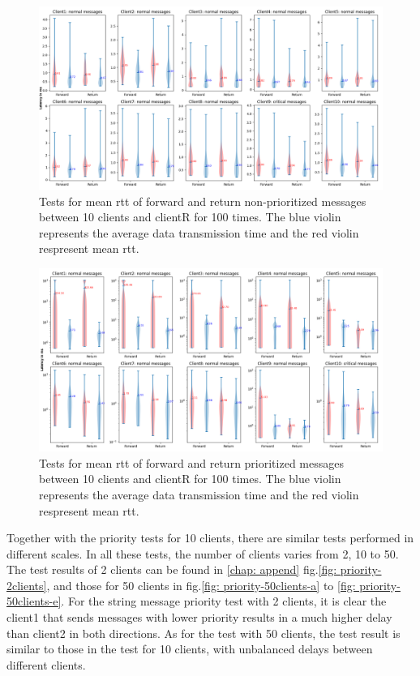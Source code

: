 \begin{figure}
    \centering
    \includegraphics[width=\textheight]{figures/tests/priority_tests/log_violin_10clients_non_priority.png}\hfill 
    \caption{Tests for mean \gls{rtt} of forward and return non-prioritized messages between 10 clients 
    and clientR for 100 times. The blue violin represents the average data transmission time and the red violin 
    respresent mean \gls{rtt}.} \label{fig: priority-10clients-a}
\end{figure}
\begin{figure}
    \includegraphics[width=\textheight]{figures/tests/priority_tests/log_violin_10clients_priority.png}\hfill 
    \caption{Tests for mean \gls{rtt} of forward and return prioritized messages between 10 clients 
    and clientR for 100 times. The blue violin represents the average data transmission time and the red violin 
    respresent mean \gls{rtt}.} \label{fig: priority-10clients-b}
\end{figure}



Together with the priority tests for 10 clients, there are similar tests performed in different scales. 
In all these tests, the number of clients varies from 2, 10 to 50. The test results 
of 2 clients can be found in \ref{chap: append} fig.\ref{fig: priority-2clients}, 
and those for 50 clients in fig.\ref{fig: priority-50clients-a} to 
\ref{fig: priority-50clients-e}. For the string message priority test with 2 clients, 
it is clear the client1 that sends messages with lower priority results in 
a much higher delay than client2 in both directions. As for the test with 50 clients, 
the test result is similar to those in the test for 10 clients, with unbalanced 
delays between different clients.  

